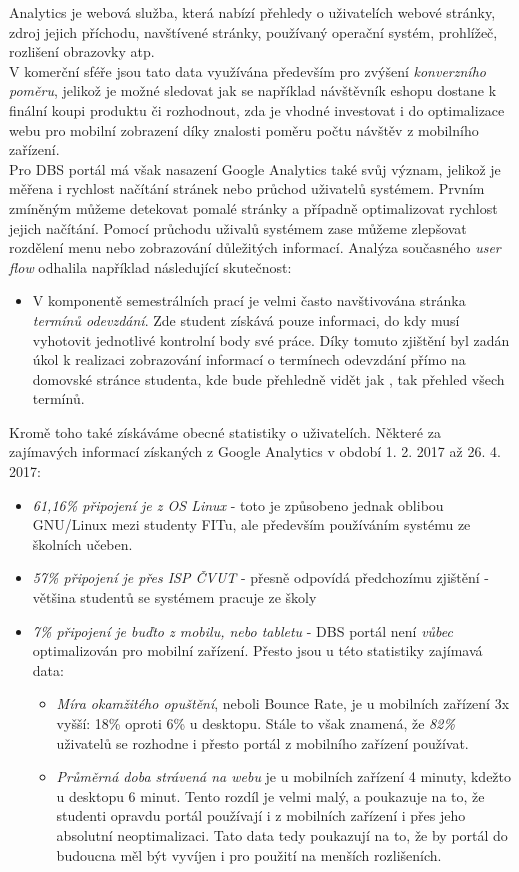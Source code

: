 Analytics \cite{ga} je webová služba, která nabízí přehledy o uživatelích webové stránky, zdroj jejich příchodu, navštívené stránky, používaný operační systém, prohlížeč, rozlišení obrazovky atp.\\
V komerční sféře jsou tato data využívána především pro zvýšení \emph{konverzního poměru}, jelikož je možné sledovat jak se například návštěvník eshopu dostane k finální koupi produktu či rozhodnout, zda je vhodné investovat i do optimalizace webu pro mobilní zobrazení díky znalosti poměru počtu návštěv z mobilního zařízení.\\
Pro DBS portál má však nasazení Google Analytics také svůj význam, jelikož je měřena i rychlost načítání stránek nebo průchod uživatelů systémem. Prvním zmíněným můžeme detekovat pomalé stránky a případně optimalizovat rychlost jejich načítání. Pomocí průchodu uživalů systémem zase můžeme zlepšovat rozdělení menu nebo zobrazování důležitých informací. Analýza současného \emph{user flow} odhalila například následující skutečnost:
\begin{itemize}
	\item V komponentě semestrálních prací je velmi často navštivována stránka \emph{termínů odevzdání}. Zde student získává pouze informaci, do kdy musí vyhotovit jednotlivé kontrolní body své práce. Díky tomuto zjištění byl zadán úkol k realizaci zobrazování informací o termínech odevzdání přímo na domovské stránce studenta, kde bude přehledně vidět jak , tak přehled všech termínů.
\end{itemize}

Kromě toho také získáváme obecné statistiky o uživatelích. Některé za zajímavých informací získaných z Google Analytics v období 1. 2. 2017 až 26. 4. 2017:
\begin{itemize}
	\item \emph{61,16\% připojení je z OS Linux} - toto je způsobeno jednak oblibou GNU/Linux mezi studenty FITu, ale především používáním systému ze školních učeben.
	\item \emph{57\% připojení je přes ISP ČVUT} - přesně odpovídá předchozímu zjištění - většina studentů se systémem pracuje ze školy
	\item \emph{7\% připojení je buďto z mobilu, nebo tabletu} - DBS portál není \emph{vůbec} optimalizován pro mobilní zařízení. Přesto jsou u této statistiky zajímavá data:
	\begin{itemize}
		\item \emph{Míra okamžitého opuštění}, neboli Bounce Rate, je u mobilních zařízení 3x vyšší: 18\% oproti 6\% u desktopu. Stále to však znamená, že \emph{82\%} uživatelů se rozhodne i přesto portál z mobilního zařízení používat.
		\item \emph{Průměrná doba strávená na webu} je u mobilních zařízení 4 minuty, kdežto u desktopu 6 minut. Tento rozdíl je velmi malý, a poukazuje na to, že studenti opravdu portál používají i z mobilních zařízení i přes jeho absolutní neoptimalizaci. Tato data tedy poukazují na to, že by portál do budoucna měl být vyvíjen i pro použití na menších rozlišeních.
	\end{itemize}
\end{itemize}

